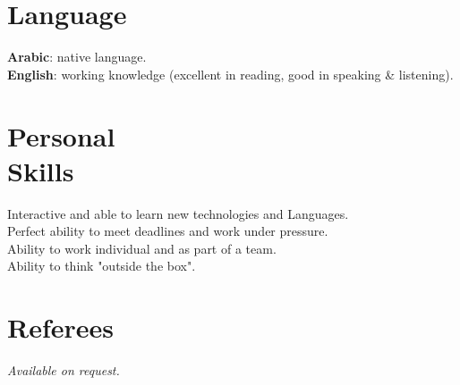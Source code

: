 \documentclass[margin,line]{resume}
\begin{document}
\begin{resume}
\vspace{-2mm}

\section{\mysidestyle Language}
	\textbf{Arabic}:   native language.\\
	\textbf{English}: working knowledge (excellent in reading, good in speaking \& listening).\\

\section{\mysidestyle Personal\\Skills}
	Interactive and able to learn new technologies and Languages.\\
	Perfect ability to meet deadlines and work under pressure.\\
	Ability to work individual and as part of a team.\\
	Ability to think "outside the box".

    \section{\mysidestyle Referees} 
    {\sl Available on request.}

\end{resume}
\end{document}
